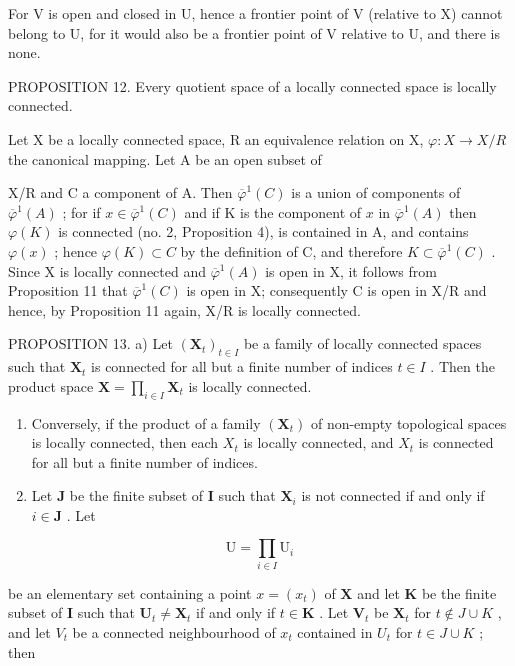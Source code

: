 For V is open and closed in U, hence a frontier point of V (relative to X) cannot belong to U, for it would also be a frontier point of V relative to U, and there is none.

PROPOSITION 12. Every quotient space of a locally connected space is locally connected.

Let X be a locally connected space, R an equivalence relation on X, \(\varphi: X \to X/R\) the canonical mapping. Let A be an open subset of

X/R and C a component of A. Then \(\overline{\varphi}^{1}(C)\) is a union of components of \(\overline{\varphi}^{1}(A)\) ; for if \(x \in \overline{\varphi}^{1}(C)\) and if K is the component of \(x\) in \(\overline{\varphi}^{1}(A)\) then \(\varphi(K)\) is connected (no. 2, Proposition 4), is contained in A, and contains \(\varphi(x)\) ; hence \(\varphi(K) \subset C\) by the definition of C, and therefore \(K \subset \overline{\varphi}^{1}(C)\) . Since X is locally connected and \(\overline{\varphi}^{1}(A)\) is open in X, it follows from Proposition 11 that \(\overline{\varphi}^{1}(C)\) is open in X; consequently C is open in X/R and hence, by Proposition 11 again, X/R is locally connected.

PROPOSITION 13. a) Let \((\mathbf{X}_t)_{t \in I}\) be a family of locally connected spaces such that \(\mathbf{X}_t\) is connected for all but a finite number of indices \(t \in I\) . Then the product space \(\mathbf{X} = \prod_{i \in I} \mathbf{X}_t\) is locally connected.

\begin{enumerate}
\def\labelenumi{\alph{enumi})}
\setcounter{enumi}{1}
\item
  Conversely, if the product of a family \((\mathbf{X}_{t})\) of non-empty topological spaces is locally connected, then each \(X_{t}\) is locally connected, and \(X_{t}\) is connected for all but a finite number of indices.
\item
  Let \(\mathbf{J}\) be the finite subset of \(\mathbf{I}\) such that \(\mathbf{X}_i\) is not connected if and only if \(i \in \mathbf{J}\) . Let
\end{enumerate}

\[
\mathrm{U} = \prod_ {i \in I} \mathrm{U} _ {i}
\]

be an elementary set containing a point \(x = (x_{t})\) of \(\mathbf{X}\) and let \(\mathbf{K}\) be the finite subset of \(\mathbf{I}\) such that \(\mathbf{U}_{t} \neq \mathbf{X}_{t}\) if and only if \(t \in \mathbf{K}\) . Let \(\mathbf{V}_{t}\) be \(\mathbf{X}_{t}\) for \(t \notin J \cup K\) , and let \(V_{t}\) be a connected neighbourhood of \(x_{t}\) contained in \(U_{t}\) for \(t \in J \cup K\) ; then

